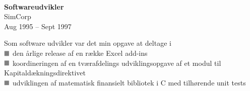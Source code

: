 \documentclass[10pt, a4paper]{article}
\newcommand*{\greysquare}{\textcolor{gray}{\blacksquare}}
\begin{document}
\\[0.5cm]
\begin{Row}%
  \begin{Cell}{1}
    \textbf{Softwareudvikler} \\ [1ex]
    SimCorp \\
    Aug 1995 -- Sept 1997 %
  \end{Cell}
  \begin{Cell}{3}
    Som software udvikler var det min opgave at deltage i \\ [1ex]
    $\greysquare$ den årlige release af en række Excel add-ins \\
    $\greysquare$ koordineringen af en tværafdelings udviklingsopgave af et
    modul til Ka\-pi\-tal\-dæk\-nings\-di\-rek\-ti\-vet \\
    $\greysquare$ udviklingen af matematisk finansielt bibliotek i C med
    tilhørende unit tests
  \end{Cell}
\end{Row}

\end{document}
